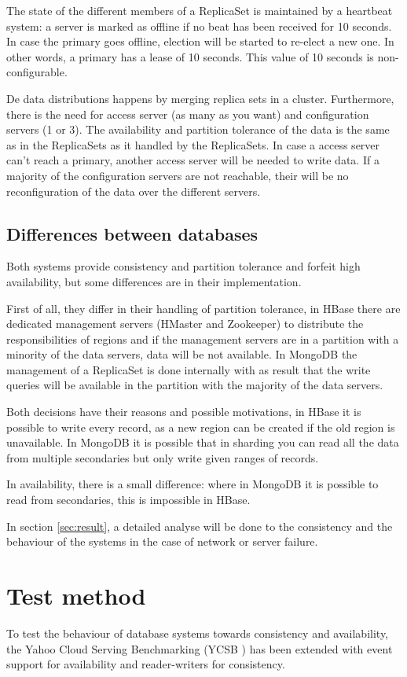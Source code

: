 \documentclass[final,5p,times]{elsarticle}
\begin{document}
The state of the different members of a ReplicaSet is maintained by a heartbeat system: a server is marked as offline if no beat has been received for 10 seconds. In case the primary goes offline, election will be started to re-elect a new one. In other words, a primary has a lease of 10 seconds. This value of 10 seconds is non-configurable. 

De data distributions happens by merging replica sets in a cluster. Furthermore, there is the need for access server (as many as you want) and configuration servers (1 or 3). The availability and partition tolerance of the data is the same as in the ReplicaSets as it handled by the ReplicaSets. In case a access server can't reach a primary, another access server will be needed to write data. If a majority of the configuration servers are not reachable, their will be no reconfiguration of the data over the different servers.  

\subsection{Differences between databases} 
Both systems provide consistency and partition tolerance and forfeit high availability, but some differences are in their implementation. 

First of all, they differ in their handling of partition tolerance, in HBase there are dedicated management servers (HMaster and Zookeeper) to distribute the responsibilities of regions and if the management servers are in a partition with a minority of the data servers, data will be not available. In MongoDB the management of a ReplicaSet is done internally with as result that the write queries will be available in the partition with the majority of the data servers.

Both decisions have their reasons and possible motivations, in HBase it is possible to write every record, as a new region can be created if the old region is unavailable. In MongoDB it is possible that in sharding you can read all the data from multiple secondaries but only write given ranges of records.

In availability, there is a small difference: where in MongoDB it is possible to read from secondaries, this is impossible in HBase. 

In section \ref{sec:result}, a detailed analyse will be done to the consistency and the behaviour of the systems in the case of network or server failure. 

\section{Test method}\label{sec:testmethod}
To test the behaviour of database systems towards consistency and availability, the Yahoo Cloud Serving Benchmarking (YCSB \cite{cooper2010benchmarking}) has been extended with event support for availability and reader-writers for consistency.
\end{document}
